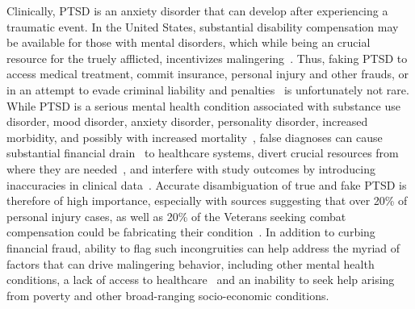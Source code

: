 \documentclass[onecolumn,10pt]{IEEEtran}
\begin{document}
Clinically, PTSD is an anxiety disorder that can develop after experiencing a traumatic event. In the United States,  substantial disability compensation may be  available for  those with mental disorders, which while being an crucial resource for the truely afflicted, incentivizes malingering~\cite{frueh2007us,taylor2007detection}.  Thus,  faking PTSD to access medical treatment, commit insurance, personal injury and other frauds,  or in an attempt to evade criminal liability and penalties~\cite{guriel2003assessing,salloway1990opiate,resnick2008malingering,burkett1998stolen} is unfortunately not rare. While  PTSD is a serious mental health condition  associated with  substance use disorder, mood disorder, anxiety disorder,  personality disorder, increased morbidity,  and possibly with increased  mortality~\cite{goldstein2016epidemiology,schnurr2009posttraumatic}, false  diagnoses can cause substantial financial drain~\cite{lopiccolo1999current, oboler2000disability} to  healthcare systems, divert crucial resources from where they are needed~\cite{taylor2006clinician}, and interfere with study outcomes by introducing inaccuracies in clinical data~\cite{rosen2006dsm}. Accurate disambiguation of true and fake PTSD is therefore  of high importance, especially with sources suggesting that over 20\% of  personal injury cases, as well as  20\%  of the Veterans seeking combat compensation could be  fabricating their condition~\cite{marx2011ptsd,rogers1994explanatory,leeshaley1997mmpi2,frueh2007us}.
In addition to curbing  financial fraud, ability to flag such incongruities can help address the myriad of   factors that can  drive malingering behavior, including other mental health conditions, a lack of access to healthcare~\cite{park2021race,muntaner2004socioeconomic} and  an inability to seek help arising from poverty and other broad-ranging socio-economic conditions.
\end{document}
